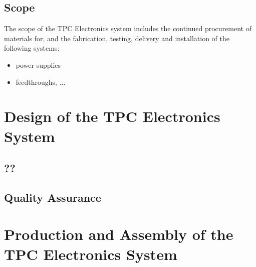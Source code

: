 

\subsection{Scope}
\label{sec:fdsp-tpc-elec-scope}

The scope of the TPC Electronics system includes the continued procurement of materials for, and the fabrication, testing, delivery and installation of the following systems: 


\begin{itemize}
\item power supplies 
\item feedthroughs, ...
\end{itemize}



\section{Design of the TPC Electronics System}
\label{sec:fdsp-tpc-elec-design}




\subsection{??}
\label{sec:fdsp-tpc-elec-??}

\subsection{Quality Assurance}
\label{sec:fdsp-tpc-elec-qa}




\section{Production and Assembly of the TPC Electronics System}
\label{sec:fdsp-tpc-elec-prod-assy}


